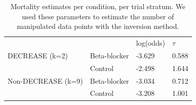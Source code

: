 \documentclass[]{article}
\begin{document}
\begin{longtable}[]{@{}llll@{}}
\caption{Mortality estimates per condition, per trial stratum. We used
these parameters to estimate the number of manipulated data points with
the inversion method.}\tabularnewline
\toprule
\begin{minipage}[t]{0.24\columnwidth}\raggedright\strut
\strut
\end{minipage} & \begin{minipage}[t]{0.24\columnwidth}\raggedright\strut
\strut
\end{minipage} & \begin{minipage}[t]{0.24\columnwidth}\raggedright\strut
log(odds)\strut
\end{minipage} & \begin{minipage}[t]{0.24\columnwidth}\raggedright\strut
\(\tau\)\strut
\end{minipage}\tabularnewline
DECREASE (k=2) & Beta-blocker & -3.629 & 0.588\tabularnewline
\begin{minipage}[t]{0.24\columnwidth}\raggedright\strut
\strut
\end{minipage} & \begin{minipage}[t]{0.24\columnwidth}\raggedright\strut
Control\strut
\end{minipage} & \begin{minipage}[t]{0.24\columnwidth}\raggedright\strut
-2.498\strut
\end{minipage} & \begin{minipage}[t]{0.24\columnwidth}\raggedright\strut
1.644\strut
\end{minipage}\tabularnewline
Non-DECREASE (k=9) & Beta-blocker & -3.034 & 0.712\tabularnewline
\begin{minipage}[t]{0.24\columnwidth}\raggedright\strut
\strut
\end{minipage} & \begin{minipage}[t]{0.24\columnwidth}\raggedright\strut
Control\strut
\end{minipage} & \begin{minipage}[t]{0.24\columnwidth}\raggedright\strut
-3.208\strut
\end{minipage} & \begin{minipage}[t]{0.24\columnwidth}\raggedright\strut
1.001\strut
\end{minipage}\tabularnewline
\bottomrule
\end{longtable}
\end{document}
